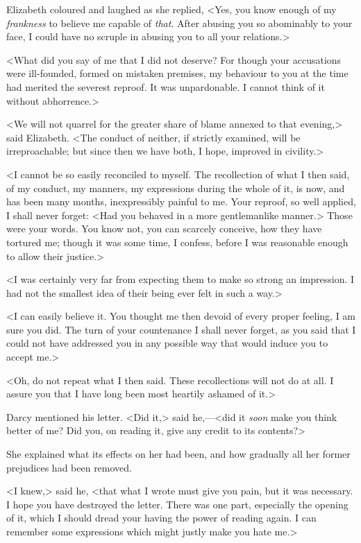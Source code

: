 Elizabeth coloured and laughed as she replied, <Yes, you know enough of my \textit{frankness} to believe me capable of \textit{that}. After abusing you so abominably to your face, I could have no scruple in abusing you to all your relations.>

<What did you say of me that I did not deserve? For though your accusations were ill-founded, formed on mistaken premises, my behaviour to you at the time had merited the severest reproof. It was unpardonable. I cannot think of it without abhorrence.>

<We will not quarrel for the greater share of blame annexed to that evening,> said Elizabeth. <The conduct of neither, if strictly examined, will be irreproachable; but since then we have both, I hope, improved in civility.>

<I cannot be so easily reconciled to myself. The recollection of what I then said, of my conduct, my manners, my expressions during the whole of it, is now, and has been many months, inexpressibly painful to me. Your reproof, so well applied, I shall never forget: <Had you behaved in a more gentlemanlike manner.> Those were your words. You know not, you can scarcely conceive, how they have tortured me; though it was some time, I confess, before I was reasonable enough to allow their justice.>

<I was certainly very far from expecting them to make so strong an impression. I had not the smallest idea of their being ever felt in such a way.>

<I can easily believe it. You thought me then devoid of every proper feeling, I am sure you did. The turn of your countenance I shall never forget, as you said that I could not have addressed you in any possible way that would induce you to accept me.>

<Oh, do not repeat what I then said. These recollections will not do at all. I assure you that I have long been most heartily ashamed of it.>

Darcy mentioned his letter. <Did it,> said he,—<did it \textit{soon} make you think better of me? Did you, on reading it, give any credit to its contents?>

She explained what its effects on her had been, and how gradually all her former prejudices had been removed.

<I knew,> said he, <that what I wrote must give you pain, but it was necessary. I hope you have destroyed the letter. There was one part, especially the opening of it, which I should dread your having the power of reading again. I can remember some expressions which might justly make you hate me.>

